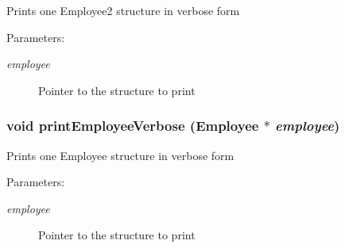 Prints one Employee2 structure in verbose form \begin{Desc}
\item[Parameters:]
\begin{description}
\item[{\em employee}]Pointer to the structure to print \end{description}
\end{Desc}
\subsubsection{\setlength{\rightskip}{0pt plus 5cm}void print\-Employee\-Verbose (\bf{Employee} $\ast$ {\em employee})}\label{employee_8h_4d9da5be2623d2f7814ac0345dbe1733}


Prints one Employee structure in verbose form \begin{Desc}
\item[Parameters:]
\begin{description}
\item[{\em employee}]Pointer to the structure to print \end{description}
\end{Desc}
